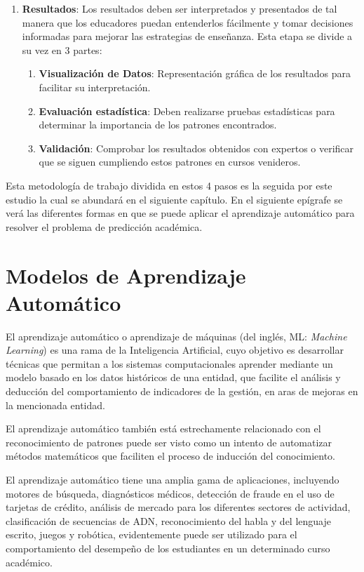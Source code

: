 \begin{enumerate}
    \item \textbf{Resultados}: Los resultados deben ser interpretados y presentados de tal manera que los educadores puedan entenderlos fácilmente y tomar decisiones informadas para mejorar las estrategias de enseñanza. Esta etapa se divide a su vez en 3 partes:
    \begin{enumerate}
        \item \textbf{Visualización de Datos}: Representación gráfica de los resultados para facilitar su interpretación.
        \item \textbf{Evaluación estadística}: Deben realizarse pruebas estadísticas para determinar la importancia de los patrones encontrados.
        \item \textbf{Validación}: Comprobar los resultados obtenidos con expertos o verificar que se siguen cumpliendo estos patrones en cursos venideros.
    \end{enumerate} 

\end{enumerate}
Esta metodología de trabajo dividida en estos 4 pasos es la seguida por este estudio la cual se abundará en el siguiente capítulo. En el siguiente epígrafe se verá las diferentes formas en que se puede aplicar el aprendizaje automático para resolver el problema de predicción académica.  

\section{Modelos de Aprendizaje Automático}

El aprendizaje automático o aprendizaje de máquinas (del inglés, ML: \textit{Machine Learning}) es una rama de la Inteligencia Artificial, cuyo objetivo es desarrollar técnicas que permitan a los sistemas computacionales aprender mediante un modelo basado en los datos históricos de una entidad, que facilite el análisis y deducción del comportamiento de indicadores de la gestión, en aras de mejoras en la mencionada entidad.  


El aprendizaje automático también está estrechamente relacionado con el reconocimiento de patrones puede ser visto como un intento de automatizar métodos matemáticos que faciliten el proceso de inducción del conocimiento.  


El aprendizaje automático tiene una amplia gama de aplicaciones, incluyendo motores de búsqueda, diagnósticos médicos, detección de fraude en el uso de tarjetas de crédito, análisis de mercado para los diferentes sectores de actividad, clasificación de secuencias de ADN, reconocimiento del habla y del lenguaje escrito, juegos y robótica, evidentemente puede ser utilizado para el comportamiento del desempeño de los estudiantes en un determinado curso académico.  



